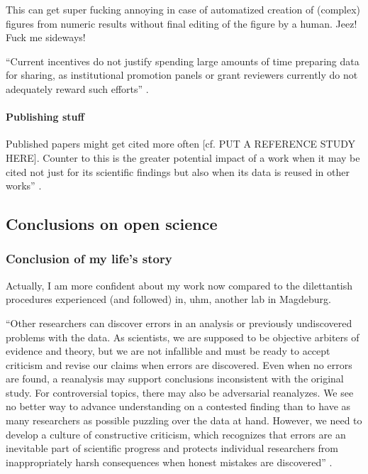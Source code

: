 %
This can get super fucking annoying in case of automatized creation of (complex)
figures from numeric results without final editing of the figure by a human.
Jeez! Fuck me sideways!

``Current incentives do not justify spending large amounts of time preparing
data for sharing, as institutional promotion panels or grant reviewers currently
do not adequately reward such efforts'' \citep{nichols2017best}.


\paragraph{Publishing stuff}



%
Published papers might get cited more often [cf. PUT A REFERENCE STUDY HERE].
%
Counter to this is the greater potential impact of a work when it may be cited
not just for its scientific findings but also when its data is reused in other
works'' \citep{nichols2017best}.


\subsection{Conclusions on open science}

\subsubsection{Conclusion of my life's story}

%
Actually, I am more confident about my work now compared to the dilettantish
procedures experienced (and followed) in, uhm, another lab in Magdeburg.

``Other researchers can discover errors in an analysis or previously
undiscovered problems with the data.
%
As scientists, we are supposed to be objective arbiters of evidence and theory,
but we are not infallible and must be ready to accept criticism and revise our
claims when errors are discovered.
%
Even when no errors are found, a reanalysis may support conclusions inconsistent
with the original study.
%
For controversial topics, there may also be adversarial reanalyzes.
%
We see no better way to advance understanding on a contested finding than to
have as many researchers as possible puzzling over the data at hand.
%
However, we need to develop a culture of constructive criticism, which
recognizes that errors are an inevitable part of scientific progress and
protects individual researchers from inappropriately harsh consequences when
honest mistakes are discovered'' \citep{nichols2017best}.


